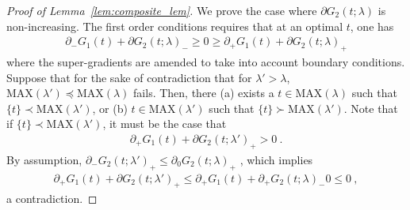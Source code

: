 	
	\begin{proof}[Proof of Lemma~\ref{lem:composite_lem}] We prove the case where $\partial G_2(t;\lambda)$ is non-increasing. The first order conditions requires that at an optimal $t$, one has 
	\begin{eqnarray*}
	\partial_- G_1(t) + \partial G_2(t;\lambda)_- \ge 0  \ge \partial_+ G_1(t) + \partial G_2(t;\lambda)_+
	\end{eqnarray*}
	where the super-gradients are amended to take into account boundary conditions. Suppose that for the sake of contradiction that for $\lambda' > \lambda$, $\mathrm{MAX}(\lambda') \preceq \mathrm{MAX}(\lambda)$ fails. Then, there (a) exists a $t \in \mathrm{MAX}(\lambda)$ such that $\{t\} \prec \mathrm{MAX}(\lambda')$, or (b) $t \in \mathrm{MAX}(\lambda')$ such that $\{t\} \succ \mathrm{MAX}(\lambda')$. Note that if $\{t\} \prec \mathrm{MAX}(\lambda')$, it must be the case that
	\begin{eqnarray*}
	\partial_+ G_1(t) + \partial G_2(t;\lambda')_+  > 0\:.
	\end{eqnarray*}
	By assumption, $\partial_- G_2(t;\lambda')_+ \le \partial_0 G_2(t;\lambda)_+$ , which implies
	\begin{eqnarray*}
	\partial_+ G_1(t) + \partial G_2(t;\lambda')_+ \le \partial_+ G_1(t) + \partial_+ G_2(t;\lambda)_- 0 \le 0\:,
	\end{eqnarray*}
	a contradiction.
	\end{proof}



	
	
